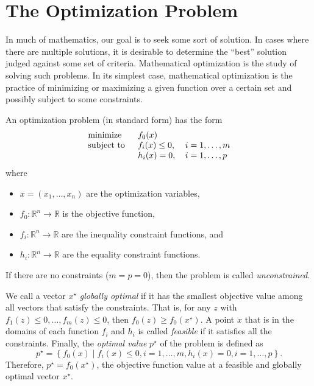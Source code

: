 \section{The Optimization Problem}

In much of mathematics, our goal is to seek some sort of solution. In cases where there are multiple solutions, it is desirable to determine the ``best'' solution judged against some set of criteria. Mathematical optimization is the study of solving such problems. In its simplest case, mathematical optimization is the practice of minimizing or maximizing a given function over a certain set and possibly subject to some constraints.

\begin{defn}
	An optimization problem (in standard form) has the form
	\begin{equation}
		\begin{tabular}{lll}
			\text{minimize }   & $f_0(x)$        &                 \\
			\text{subject to } & $f_i(x)\leq 0$, & $i=1,\ldots, m$ \\
			& $h_i(x) = 0$,   & $i=1,\ldots, p$ 
		\end{tabular}\label{Optimization}
	\end{equation}
	where
	\begin{itemize}
		\item $x=\left(x_1,\ldots,x_n\right)$ are the optimization variables,
		\item $f_0 : \mathbb{R}^n\rightarrow\mathbb{R}$ is the objective function,
		\item $f_i : \mathbb{R}^n\rightarrow\mathbb{R}$ are the inequality constraint functions, and
		\item $h_i : \mathbb{R}^n\rightarrow\mathbb{R}$ are the equality constraint functions.
	\end{itemize}
\end{defn}
If there are no constraints ($m=p=0$), then the problem is called \textit{unconstrained}. \cite[p. 127]{Boyd2004}

We call a vector $x^\star$ \textit{globally optimal} if it has the smallest objective value among all vectors that satisfy the constraints. That is, for any $z$ with $f_1(z)\leq 0,\ldots, f_m(z)\leq 0$, then $f_0(z)\geq f_0(x^\star)$. A point $x$ that is in the domains of each function $f_i$ and $h_i$ is called \textit{feasible} if it satisfies all the constraints. Finally, the \textit{optimal value} $p^\star$ of the problem is defined as $$p^\star=\left\lbrace f_0(x) \mid f_i(x)\leq 0, i=1,\ldots,m, h_i(x)=0, i=1,\ldots,p\right\rbrace.$$ Therefore, $p^{\star}=f_0(x^\star)$, the objective function value at a feasible and globally optimal vector $x^{\star}$.

